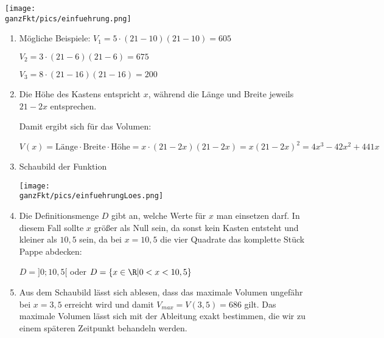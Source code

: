 \texttt{[image: \\ganzFkt/pics/einfuehrung.png]}
\newpage
\begin{enumerate}[label=\alph*)]
	\item Mögliche Beispiele: \(V_1=5\cdot \left(21-10\right)\left(21-10\right)=605\)
	
	\hphantom{Mögliche Beispiele: }\(V_2=3\cdot \left(21-6\right)\left(21-6\right)=675\)
	
	\hphantom{Mögliche Beispiele: }\(V_3=8\cdot \left(21-16\right)\left(21-16\right)=200\)
	\item Die Höhe des Kastens entspricht \(x\), während die Länge und Breite jeweils \(21-2x\) entsprechen.
	
	Damit ergibt sich für das Volumen:
	
	\(V(x)=\text{Länge}\cdot \text{Breite}\cdot \text{Höhe}=x\cdot \left(21-2x\right)\left(21-2x\right)=x\left(21-2x\right)^2=4x^3-42x^2+441x\)
	\item
	Schaubild der Funktion\\
	\begin{minipage}{\linewidth}
		\texttt{[image: \\ganzFkt/pics/einfuehrungLoes.png]}
	\end{minipage}
	
	\item Die Definitionsmenge \(D\) gibt an, welche Werte für \(x\) man einsetzen darf. In diesem Fall sollte \(x\) größer als Null sein, da sonst kein Kasten entsteht und kleiner als \(10,5\) sein, da bei \(x=10,5\) die vier Quadrate das komplette Stück Pappe abdecken:
	
	\(D=]0;10,5[\) oder \(D=\{x\in\R \vert 0< x < 10,5\}\)
	\item Aus dem Schaubild lässt sich ablesen, dass das maximale Volumen ungefähr bei \(x=3,5\) erreicht wird und damit  \(V_{max}=V(3,5)=686\) gilt. Das maximale Volumen lässt sich mit der Ableitung exakt bestimmen, die wir zu einem späteren Zeitpunkt behandeln werden.
\end{enumerate}